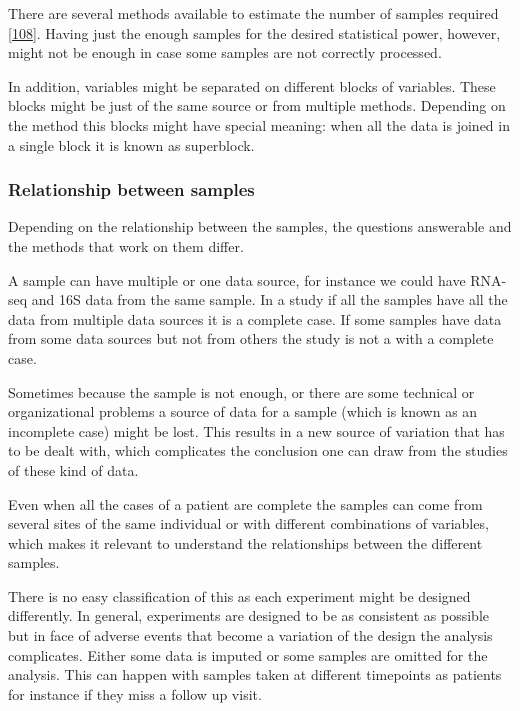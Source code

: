 \documentclass[
  12pt,
  a4paper,
  twoside,
  openright]{book}
\begin{document}
There are several methods available to estimate the number of samples required {[}\protect\hyperlink{ref-tarazona2020}{108}{]}.
Having just the enough samples for the desired statistical power, however, might not be enough in case some samples are not correctly processed.

In addition, variables might be separated on different blocks of variables.
These blocks might be just of the same source or from multiple methods.
Depending on the method this blocks might have special meaning: when all the data is joined in a single block it is known as superblock.

\hypertarget{relationship-between-samples}{%
\subsubsection{Relationship between samples}\label{relationship-between-samples}}

Depending on the relationship between the samples, the questions answerable and the methods that work on them differ.

A sample can have multiple or one data source, for instance we could have RNA-seq and 16S data from the same sample.
In a study if all the samples have all the data from multiple data sources it is a complete case.
If some samples have data from some data sources but not from others the study is not a with a complete case.

Sometimes because the sample is not enough, or there are some technical or organizational problems a source of data for a sample (which is known as an incomplete case) might be lost.
This results in a new source of variation that has to be dealt with, which complicates the conclusion one can draw from the studies of these kind of data.

Even when all the cases of a patient are complete the samples can come from several sites of the same individual or with different combinations of variables, which makes it relevant to understand the relationships between the different samples.

There is no easy classification of this as each experiment might be designed differently.
In general, experiments are designed to be as consistent as possible but in face of adverse events that become a variation of the design the analysis complicates.
Either some data is imputed or some samples are omitted for the analysis.
This can happen with samples taken at different timepoints as patients for instance if they miss a follow up visit.
\end{document}
